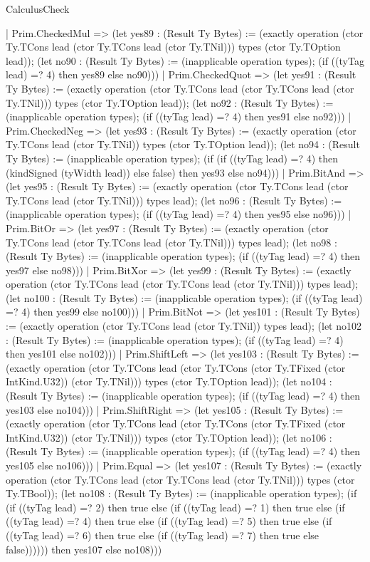 \begin{lexlean}{CalculusCheck}
\begin{semanticmodule}
{    | Prim.CheckedMul => (let yes89 : (Result Ty Bytes) := (exactly operation (ctor Ty.TCons lead (ctor Ty.TCons lead (ctor Ty.TNil))) types (ctor Ty.TOption lead)); (let no90 : (Result Ty Bytes) := (inapplicable operation types); (if ((tyTag lead) =? 4) then yes89 else no90)))
    | Prim.CheckedQuot => (let yes91 : (Result Ty Bytes) := (exactly operation (ctor Ty.TCons lead (ctor Ty.TCons lead (ctor Ty.TNil))) types (ctor Ty.TOption lead)); (let no92 : (Result Ty Bytes) := (inapplicable operation types); (if ((tyTag lead) =? 4) then yes91 else no92)))
    | Prim.CheckedNeg => (let yes93 : (Result Ty Bytes) := (exactly operation (ctor Ty.TCons lead (ctor Ty.TNil)) types (ctor Ty.TOption lead)); (let no94 : (Result Ty Bytes) := (inapplicable operation types); (if (if ((tyTag lead) =? 4) then (kindSigned (tyWidth lead)) else false) then yes93 else no94)))
    | Prim.BitAnd => (let yes95 : (Result Ty Bytes) := (exactly operation (ctor Ty.TCons lead (ctor Ty.TCons lead (ctor Ty.TNil))) types lead); (let no96 : (Result Ty Bytes) := (inapplicable operation types); (if ((tyTag lead) =? 4) then yes95 else no96)))
    | Prim.BitOr => (let yes97 : (Result Ty Bytes) := (exactly operation (ctor Ty.TCons lead (ctor Ty.TCons lead (ctor Ty.TNil))) types lead); (let no98 : (Result Ty Bytes) := (inapplicable operation types); (if ((tyTag lead) =? 4) then yes97 else no98)))
    | Prim.BitXor => (let yes99 : (Result Ty Bytes) := (exactly operation (ctor Ty.TCons lead (ctor Ty.TCons lead (ctor Ty.TNil))) types lead); (let no100 : (Result Ty Bytes) := (inapplicable operation types); (if ((tyTag lead) =? 4) then yes99 else no100)))
    | Prim.BitNot => (let yes101 : (Result Ty Bytes) := (exactly operation (ctor Ty.TCons lead (ctor Ty.TNil)) types lead); (let no102 : (Result Ty Bytes) := (inapplicable operation types); (if ((tyTag lead) =? 4) then yes101 else no102)))
    | Prim.ShiftLeft => (let yes103 : (Result Ty Bytes) := (exactly operation (ctor Ty.TCons lead (ctor Ty.TCons (ctor Ty.TFixed (ctor IntKind.U32)) (ctor Ty.TNil))) types (ctor Ty.TOption lead)); (let no104 : (Result Ty Bytes) := (inapplicable operation types); (if ((tyTag lead) =? 4) then yes103 else no104)))
    | Prim.ShiftRight => (let yes105 : (Result Ty Bytes) := (exactly operation (ctor Ty.TCons lead (ctor Ty.TCons (ctor Ty.TFixed (ctor IntKind.U32)) (ctor Ty.TNil))) types (ctor Ty.TOption lead)); (let no106 : (Result Ty Bytes) := (inapplicable operation types); (if ((tyTag lead) =? 4) then yes105 else no106)))
    | Prim.Equal => (let yes107 : (Result Ty Bytes) := (exactly operation (ctor Ty.TCons lead (ctor Ty.TCons lead (ctor Ty.TNil))) types (ctor Ty.TBool)); (let no108 : (Result Ty Bytes) := (inapplicable operation types); (if (if ((tyTag lead) =? 2) then true else (if ((tyTag lead) =? 1) then true else (if ((tyTag lead) =? 4) then true else (if ((tyTag lead) =? 5) then true else (if ((tyTag lead) =? 6) then true else (if ((tyTag lead) =? 7) then true else false)))))) then yes107 else no108)))
}
\end{semanticmodule}
\end{lexlean}
